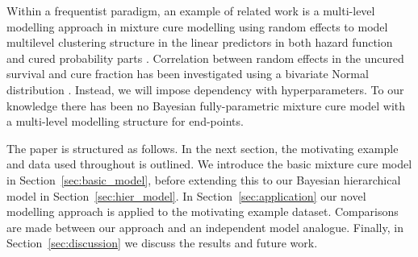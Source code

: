 \documentclass[AMA,STIX1COL]{WileyNJD-v2}
\begin{document}
Within a frequentist paradigm, an example of related work is a multi-level modelling approach in mixture cure modelling using random effects to model multilevel clustering structure in the linear predictors in both hazard function and cured probability parts \cite{Lai2009}.
Correlation between random effects in the uncured survival and cure fraction has been investigated using a bivariate Normal distribution \cite{Lai2008} \cite{Tan2018}.
Instead, we will impose dependency with hyperparameters.
To our knowledge there has been no Bayesian fully-parametric mixture cure model with a multi-level modelling structure for end-points.

The paper is structured as follows.
In the next section, the motivating example and data used throughout is outlined.
We introduce the basic mixture cure model in Section~\ref{sec:basic_model}, before extending this to our Bayesian hierarchical model in Section~\ref{sec:hier_model}.
In Section~\ref{sec:application} our novel modelling approach is applied to the motivating example dataset.
Comparisons are made between our approach and an independent model analogue.
Finally, in Section~\ref{sec:discussion} we discuss the results and future work.

%
\end{document}
